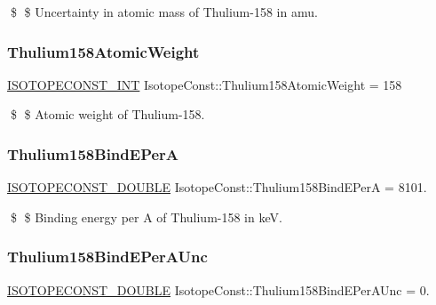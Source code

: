 \$ \$ Uncertainty in atomic mass of Thulium-\/158 in amu. \mbox{\label{group___isotope_const-_thulium-_tm158_ga3a3a80fc3ef8c03f75bf420ea85d29fb}} 
\subsubsection{\texorpdfstring{Thulium158\+Atomic\+Weight}{Thulium158AtomicWeight}}
{\footnotesize\ttfamily \mbox{\hyperlink{group___isotope_const-_macros_ga5f18360b3e99483a35c32d789e62621c}{I\+S\+O\+T\+O\+P\+E\+C\+O\+N\+S\+T\+\_\+\+I\+NT}} Isotope\+Const\+::\+Thulium158\+Atomic\+Weight = 158}

\$ \$ Atomic weight of Thulium-\/158. \mbox{\label{group___isotope_const-_thulium-_tm158_gaf1df6e8d8728bf6b558676479c6d307b}} 
\subsubsection{\texorpdfstring{Thulium158\+Bind\+E\+PerA}{Thulium158BindEPerA}}
{\footnotesize\ttfamily \mbox{\hyperlink{group___isotope_const-_macros_ga8f45a7272ce02c0b4c65c44636ed719a}{I\+S\+O\+T\+O\+P\+E\+C\+O\+N\+S\+T\+\_\+\+D\+O\+U\+B\+LE}} Isotope\+Const\+::\+Thulium158\+Bind\+E\+PerA = 8101.}

\$ \$ Binding energy per A of Thulium-\/158 in keV. \mbox{\label{group___isotope_const-_thulium-_tm158_gad08b90070ab7aadc3a6586115b1739b2}} 
\subsubsection{\texorpdfstring{Thulium158\+Bind\+E\+Per\+A\+Unc}{Thulium158BindEPerAUnc}}
{\footnotesize\ttfamily \mbox{\hyperlink{group___isotope_const-_macros_ga8f45a7272ce02c0b4c65c44636ed719a}{I\+S\+O\+T\+O\+P\+E\+C\+O\+N\+S\+T\+\_\+\+D\+O\+U\+B\+LE}} Isotope\+Const\+::\+Thulium158\+Bind\+E\+Per\+A\+Unc = 0.}

